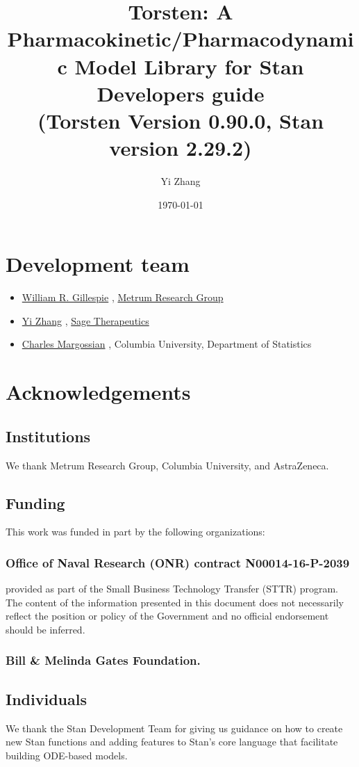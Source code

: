 \documentclass[12pt, reqno, oneside]{amsbook}
\author{Yi Zhang}
\date{\today}
\title{Torsten: A Pharmacokinetic/Pharmacodynamic Model Library for Stan\\\medskip
\large Developers guide \\  (Torsten Version 0.90.0, Stan version 2.29.2)}
\numberwithin{equation}{chapter}
\numberwithin{figure}{chapter}
\numberwithin{table}{chapter}
\theoremstyle{remark}
\begin{document}
\maketitle
\tableofcontents


\chapter*{Development team}
\label{sec:org9bb72d8}
\begin{itemize}
\item \href{mailto:billg@metrumrg.com}{William R. Gillespie} , \href{https://www.metrumrg.com/}{Metrum Research Group}
\item \href{mailto:yz@yizh.org}{Yi Zhang} , \href{https://www.sagerx.com/}{Sage Therapeutics}
\item \href{mailto:charles.margossian@columbia.edu}{Charles Margossian} , Columbia University, Department of Statistics
\end{itemize}
\chapter*{Acknowledgements}
\label{sec:org4fd8ba7}
\section*{Institutions}
\label{sec:orgc7e58d4}
We thank Metrum Research Group, Columbia University, and AstraZeneca.
\section*{Funding}
\label{sec:org209e741}
This work was funded in part by the following organizations:
\subsection*{Office of Naval Research (ONR) contract N00014-16-P-2039}
\label{sec:orgee502e1}
provided as part of the Small Business Technology Transfer (STTR)
program. The content of the information presented in this document
does not necessarily reflect the position or policy of the
Government and no official endorsement should be inferred.
\subsection*{Bill \& Melinda Gates Foundation.}
\label{sec:orgb66b095}
\section*{Individuals}
\label{sec:org431c2f6}
We thank the Stan Development Team for giving us guidance on how to
create new Stan functions and adding features to Stan's core language
that facilitate building ODE-based models.
\end{document}
